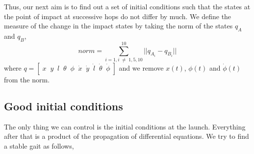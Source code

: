 Thus, our next aim is to find out a set of initial conditions such that the states at the point of impact at successive hops do not differ by much. We define the measure of the change in the impact states by taking the norm of the states $q_A$ and $q_B$,
\begin{equation}
norm = \sum_{i = 1, i\;\neq\;1, 5, 10}^{10} || q_{A_i} - q_{B_i} ||
\end{equation}
where $q = [\;x\;\;y\;\;l\;\;\theta\;\;\phi\;\;\dot{x}\;\;\dot{y}\;\;\dot{l}\;\;\dot{\theta}\;\;\dot{\phi}\;]$ and we remove $x(t)$, $\phi(t)$ and $\dot{\phi}(t)$ from the norm. 

\subsection*{Good initial conditions}
The only thing we can control is the initial conditions at the launch. Everything after that is a product of the propagation of differential equations. We try to find a stable gait as follows,

